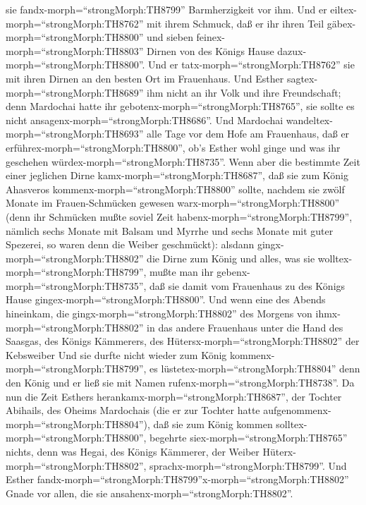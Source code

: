 sie fandx-morph=``strongMorph:TH8799'' Barmherzigkeit vor ihm. Und er
eiltex-morph=``strongMorph:TH8762'' mit ihrem Schmuck, daß er ihr ihren
Teil gäbex-morph=``strongMorph:TH8800'' und sieben
feinex-morph=``strongMorph:TH8803'' Dirnen von des Königs Hause
dazux-morph=``strongMorph:TH8800''. Und er
tatx-morph=``strongMorph:TH8762'' sie mit ihren Dirnen an den besten Ort
im Frauenhaus.  Und Esther
sagtex-morph=``strongMorph:TH8689'' ihm nicht an ihr Volk und ihre
Freundschaft; denn Mardochai hatte ihr
gebotenx-morph=``strongMorph:TH8765'', sie sollte es nicht
ansagenx-morph=``strongMorph:TH8686''.  Und Mardochai
wandeltex-morph=``strongMorph:TH8693'' alle Tage vor dem Hofe am
Frauenhaus, daß er erführex-morph=``strongMorph:TH8800'', ob's Esther
wohl ginge und was ihr geschehen würdex-morph=``strongMorph:TH8735''.
 Wenn aber die bestimmte Zeit einer jeglichen Dirne
kamx-morph=``strongMorph:TH8687'', daß sie zum König Ahasveros
kommenx-morph=``strongMorph:TH8800'' sollte, nachdem sie zwölf Monate im
Frauen-Schmücken gewesen warx-morph=``strongMorph:TH8800'' (denn ihr
Schmücken mußte soviel Zeit habenx-morph=``strongMorph:TH8799'', nämlich
sechs Monate mit Balsam und Myrrhe und sechs Monate mit guter Spezerei,
so waren denn die Weiber geschmückt):  alsdann
gingx-morph=``strongMorph:TH8802'' die Dirne zum König und alles, was
sie wolltex-morph=``strongMorph:TH8799'', mußte man ihr
gebenx-morph=``strongMorph:TH8735'', daß sie damit vom Frauenhaus zu des
Königs Hause gingex-morph=``strongMorph:TH8800''.  Und wenn
eine des Abends hineinkam, die gingx-morph=``strongMorph:TH8802'' des
Morgens von ihmx-morph=``strongMorph:TH8802'' in das andere Frauenhaus
unter die Hand des Saasgas, des Königs Kämmerers, des
Hütersx-morph=``strongMorph:TH8802'' der Kebsweiber Und sie durfte nicht
wieder zum König kommenx-morph=``strongMorph:TH8799'', es
lüstetex-morph=``strongMorph:TH8804'' denn den König und er ließ sie mit
Namen rufenx-morph=``strongMorph:TH8738''.  Da nun die Zeit
Esthers herankamx-morph=``strongMorph:TH8687'', der Tochter Abihails,
des Oheims Mardochais (die er zur Tochter hatte
aufgenommenx-morph=``strongMorph:TH8804''), daß sie zum König kommen
solltex-morph=``strongMorph:TH8800'', begehrte
siex-morph=``strongMorph:TH8765'' nichts, denn was Hegai, des Königs
Kämmerer, der Weiber Hüterx-morph=``strongMorph:TH8802'',
sprachx-morph=``strongMorph:TH8799''. Und Esther
fandx-morph=``strongMorph:TH8799''x-morph=``strongMorph:TH8802'' Gnade
vor allen, die sie ansahenx-morph=``strongMorph:TH8802''. 
